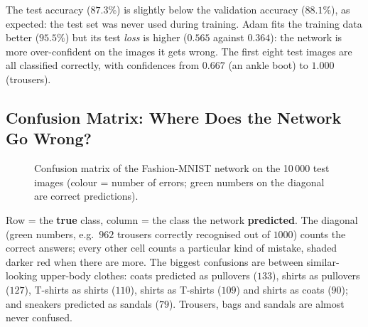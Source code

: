 \noindent The test accuracy ($87.3\%$) is slightly below the validation accuracy ($88.1\%$), as expected: the test set was never used during training. Adam fits the training data better ($95.5\%$) but its test \emph{loss} is higher ($0.565$ against $0.364$): the network is more over-confident on the images it gets wrong. The first eight test images are all classified correctly, with confidences from $0.667$ (an ankle boot) to $1.000$ (trousers).

\subsection{Confusion Matrix: Where Does the Network Go Wrong?}

\begin{figure}[!htbp]
\centering
{}
\caption{Confusion matrix of the Fashion-MNIST network on the 10\,000 test images (colour = number of errors; green numbers on the diagonal are correct predictions).}\label{fig:cm}
\end{figure}

\begin{explain}
Row = the \textbf{true} class, column = the class the network \textbf{predicted}. The diagonal (green numbers, e.g.\ $962$ trousers correctly recognised out of $1000$) counts the correct answers; every other cell counts a particular kind of mistake, shaded darker red when there are more. The biggest confusions are between similar-looking upper-body clothes: coats predicted as pullovers ($133$), shirts as pullovers ($127$), T-shirts as shirts ($110$), shirts as T-shirts ($109$) and shirts as coats ($90$); and sneakers predicted as sandals ($79$). Trousers, bags and sandals are almost never confused.
\end{explain}

